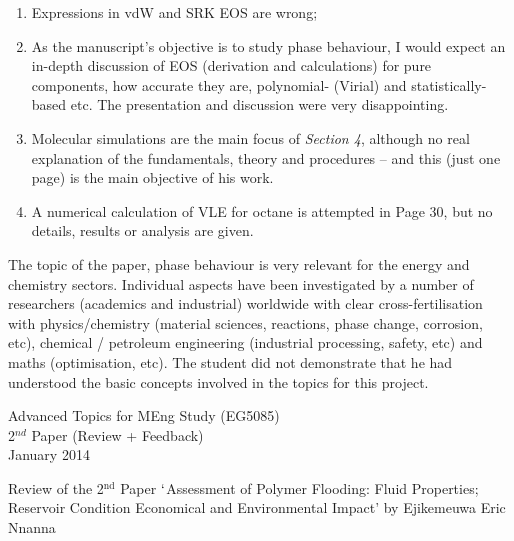 \documentclass[14pt,twoside]{report}
\begin{document}
\begin{enumerate}
%
\item Expressions in vdW and SRK EOS are wrong;
%
\item As the manuscript's objective is to study phase behaviour, I would expect an in-depth discussion of EOS (derivation and calculations) for pure components, how accurate they are, polynomial- (Virial) and statistically-based etc. The presentation and discussion were very disappointing. 
%
\item Molecular simulations are the main focus of {\it Section 4}, although no real explanation of the fundamentals, theory and procedures -- and this (just one page) is the main objective of his work.
%
\item A numerical calculation of VLE for octane is attempted in Page 30, but no details, results or analysis are given.

\end{enumerate}

The topic of the paper, phase behaviour is very relevant for the energy and chemistry sectors. Individual aspects have been investigated by a number of researchers (academics and industrial) worldwide with clear cross-fertilisation with physics/chemistry (material sciences, reactions, phase change, corrosion, etc), chemical / petroleum engineering (industrial processing, safety, etc) and maths (optimisation, etc). The student did not demonstrate that he had understood the basic concepts involved in the topics for this project.    


\clearpage


\begin{center}
\Huge{Advanced Topics for MEng Study (EG5085)}\\
\huge{2$^{nd}$ Paper (Review + Feedback)}\\
\huge{January 2014}
\end{center}

\vfill

\clearpage



\bigskip

\begin{center}
  {\Large Review of the 2$^{\text{nd}}$ Paper $\lq$Assessment of Polymer Flooding: Fluid Properties; Reservoir Condition Economical and Environmental Impact' by Ejikemeuwa Eric Nnanna}
\end{center}
\end{document}
